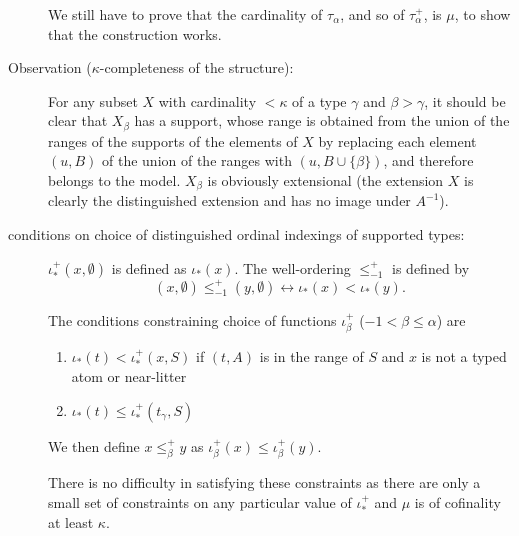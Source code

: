 \documentclass[112pt]{article}
\begin{document}
\begin{description}
We still have to prove that the cardinality of $\tau_\alpha$, and so of $\tau^+_\alpha$, is $\mu$, to show that the construction works.

\item[Observation ($\kappa$-completeness of the structure):]  For any subset $X$ with cardinality $<\kappa$ of a type $\gamma$ and $\beta>\gamma$, it should be clear that $X_\beta$ has a support, whose range is obtained from the union of the ranges of the supports of the elements of $X$  by replacing each element $(u,B)$ of the union of the ranges  with $(u,B \cup \{\beta\})$, and therefore belongs to the model.  $X_\beta$ is obviously extensional (the extension $X$ is clearly the distinguished extension and has no image under $A^{-1}$).

\item[conditions on choice of distinguished ordinal indexings of supported types:]  

$\iota_*^+(x,\emptyset)$ is defined as $\iota_*(x)$.
The well-ordering $\leq_{-1}^+$ is defined by $$(x,\emptyset) \leq_{-1}^+ (y,\emptyset) \leftrightarrow \iota_*(x) < \iota_*(y).$$

\begin{comment}

The well-ordering $\leq_\alpha^+$ of $\tau_\alpha^+$ ($\alpha \in \lambda$) must satisfy the condition that for each $(x,S) \in \tau_\alpha^+$, for each $(z,A) \in {\tt rng}(S)$ and litter $L = f_{\beta,\gamma}(y,T)$ with $\beta<\alpha$,  where $L$  meets $z$, $\iota_*^+(y,T) < \iota_*^+(x,S)$ must hold.

\end{comment}

The conditions constraining choice of functions $\iota^+_\beta$ ($-1 < \beta \leq \alpha$) are

\begin{enumerate}

\item $\iota_*(t) < \iota^+_*(x,S)$ if $(t,A)$ is in the range of $S$ and $x$ is not a typed atom or near-litter

\item $\iota_*(t) \leq \iota^+_*(t_\gamma,S)$

\end{enumerate}

We then define $x \leq^+_\beta y$ as $\iota^+_\beta(x) \leq \iota^+_\beta(y)$.

There is no difficulty in satisfying these constraints as there are only a small set of constraints on any particular value of $\iota_*^+$ and $\mu$ is of cofinality at least $\kappa$.


\end{description}
\end{document}
